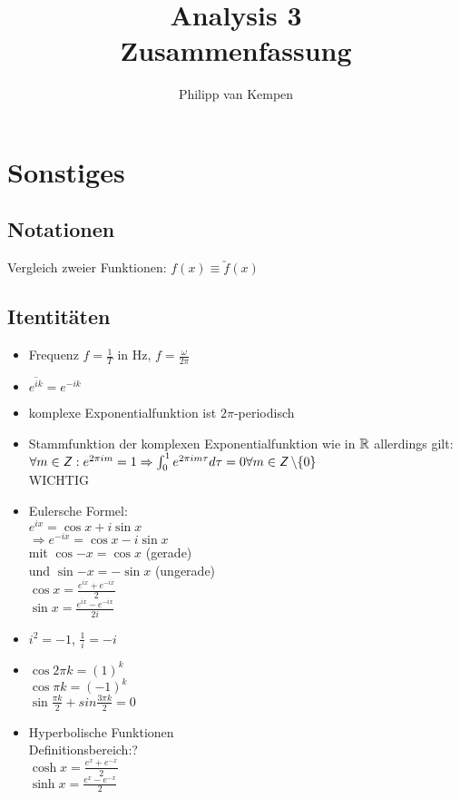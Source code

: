 \documentclass[nocolor,german]{latex4ei/latex4ei_sheet}
\title{Analysis 3\\Zusammenfassung}
\author{Philipp van Kempen}                %
\begin{document}
\maketitle      %

\section*{Sonstiges}
\subsection{Notationen}
Vergleich zweier Funktionen: $f(x) \equiv \utilde{f}(x) $
\subsection*{Itentit\"aten}
	\begin{itemize}
        \item Frequenz $f=\frac{1}{T}$ in Hz, $f=\frac{\omega}{2 \pi}$
        \item $\overline{e^{i k}}=e^{- i k}$        \item komplexe Exponentialfunktion ist $2 \pi$-periodisch
        \item Stammfunktion der komplexen Exponentialfunktion wie in $\operatorname{\mathbb R}$ allerdings gilt:\\
                $\forall m \in \operatorname{\textsf{\textit{Z}}}: e^{2 \pi i m}=1 \Rightarrow \int_0^1 e^{2 \pi i m \tau} d \tau=0 \forall m \in \operatorname{\textsf{\textit{Z}}} \setminus \{0\}$\\
				WICHTIG
        \item Eulersche Formel:\\
                $e^{i x}=\cos{x}+i \sin{x}$\\
                $\Rightarrow e^{-i x}=\cos{x}-i \sin{x}$\\
                mit $\cos{-x}=\cos{x}$ (gerade)\\
                und $\sin{-x}=-\sin{x}$ (ungerade)\\
				$\cos{x}=\frac{e^{i x}+e^{- i x}}{2}$\\
				$\sin{x}=\frac{e^{i x} - e^{- i x}}{2 i}$
        \item $i^2=-1$, $\frac{1}{i}=-i$
		\item $\cos{2 \pi k}={(1)}^k$\\
			$\cos{\pi k}={(-1)}^k$\\
			$\sin{\frac{\pi k}{2}}+sin{\frac{3 \pi k}{2}}=0$
		\item Hyperbolische Funktionen\\
			Definitionsbereich:?\\
			$\cosh{x}=\frac{e^x+e^{-x}}{2}$\\
			$\sinh{x}=\frac{e^x-e^{-x}}{2}$
	\end{itemize}
\end{document}
